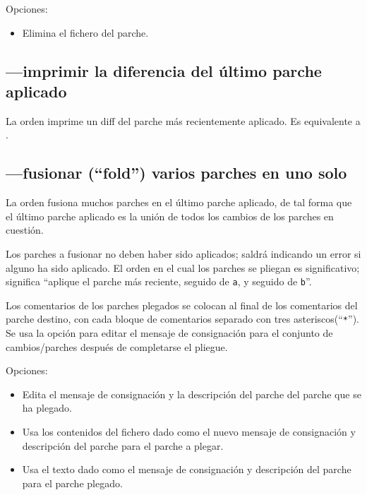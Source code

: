 Opciones:
\begin{itemize}
\item[\hgxopt{mq}{qdel}{-f}] Elimina el fichero del parche.
\end{itemize}

\subsection{---imprimir la diferencia del último
  parche aplicado}

La orden  imprime un diff del parche más
recientemente aplicado.  Es equivalente a .

\subsection{---fusionar (``fold'') varios parches en
  uno solo}

La orden  fusiona muchos parches en el último parche
aplicado, de tal forma que el último parche aplicado es la unión de
todos los cambios de los parches en cuestión.

Los parches a fusionar no deben haber sido aplicados;
 saldrá indicando un error si alguno ha sido
aplicado.  El orden en el cual los parches se pliegan es
significativo;  significa ``aplique el parche
más reciente, seguido de \texttt{a}, y seguido de \texttt{b}''.

Los comentarios de los parches plegados se colocan al final de los
comentarios del parche destino, con cada bloque de comentarios
separado con tres asteriscos(``\texttt{*}'').  Se usa la opción
 para editar el mensaje de consignación para el
conjunto de cambios/parches después de completarse el pliegue.

Opciones:
\begin{itemize}
\item[\hgxopt{mq}{qfold}{-e}] Edita el mensaje de consignación y la
  descripción del parche del parche que se ha plegado.
\item[\hgxopt{mq}{qfold}{-l}] Usa los contenidos del fichero dado como
  el nuevo mensaje de consignación y descripción del parche para el
  parche a plegar.
\item[\hgxopt{mq}{qfold}{-m}] Usa el texto dado como el mensaje de
  consignación y descripción del parche para el parche plegado.
\end{itemize}

